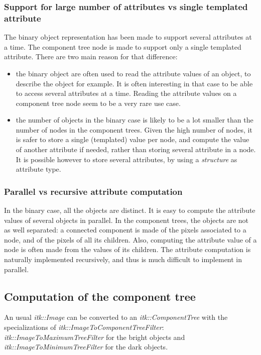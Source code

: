 \documentclass{InsightArticle}
\begin{document}
    \subsubsection{Support for large number of attributes vs single templated attribute}

The binary object representation has been made to support several attributes at a time. The component tree node is made to support only a single templated attribute. There are two main reason for that difference:
\begin{itemize}
  \item the binary object are often used to read the attribute values of an object, to describe the object for example. It is often interesting in that case to be able to access several attributes at a time. Reading the attribute values on a component tree node seem to be a very rare use case.
  \item the number of objects in the binary case is likely to be a lot smaller than the number of nodes in the component trees. Given the high number of nodes, it is safer to store a single (templated) value per node, and compute the value of another attribute if needed, rather than storing several attribute in a node. It is possible however to store several attributes, by using a {\em structure} as attribute type.
\end{itemize}

    \subsubsection{Parallel vs recursive attribute computation}

In the binary case, all the objects are distinct. It is easy to compute the attribute values of several objects in parallel. In the component trees, the objects are not as well separated: a connected component is made of the pixels associated to a node, and of the pixels of all its children. Also, computing the attribute value of a node is often made from the values of its children. The attribute computation is naturally implemented recursively, and thus is much difficult to implement in parallel.

  \subsection{Computation of the component tree}

An usual {\em itk::Image} can be converted to an {\em itk::ComponentTree} with the specializations of {\em itk::ImageToComponentTreeFilter}: {\em itk::ImageToMaximumTreeFilter} for the bright objects and {\em itk::ImageToMinimumTreeFilter} for the dark objects.
\end{document}
